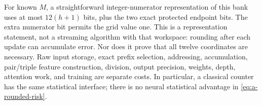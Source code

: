 For known $M$, a straightforward integer-numerator representation of
this bank uses at most $12(h+1)$ bits, plus the two exact protected
endpoint bits.  The extra numerator bit permits the grid value one.
This is a representation statement, not a streaming algorithm with
that workspace: rounding after each update can accumulate error.
Nor does it prove that all twelve coordinates are necessary.
Raw input storage, exact prefix selection, addressing, accumulation,
pair/triple feature construction, division, output precision, weights,
depth, attention work, and training are separate costs.  In particular,
a classical counter has the same statistical interface; there is no
neural statistical advantage in \eqref{eq:a-rounded-risk}.
